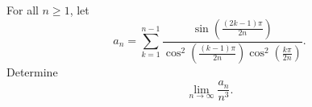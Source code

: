 For all $n \geq 1$, let
\[
a_n = \sum_{k=1}^{n-1} \frac{\sin \left( \frac{(2k-1)\pi}{2n} \right)}{\cos^2 \left( \frac{(k-1)\pi}{2n} \right) \cos^2 \left( \frac{k\pi}{2n} \right)}.
\]
Determine
\[
\lim_{n \to \infty} \frac{a_n}{n^3}.
\]
